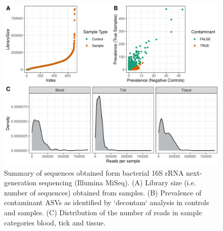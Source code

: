 \documentclass[a4paper, nobind]{templates/ociamthesis}
\begin{document}
\begin{figure}
\includegraphics[width=0.95\linewidth]{figures/ms-figs-appendix/FigA-3.1} \caption[Summary of sequences obtained from bacterial 16S rRNA metabarcoding.]{Summary of sequences obtained form bacterial 16S rRNA next-generation sequencing (Illumina MiSeq). (A) Library size (i.e. number of sequences) obtained from samples. (B) Prevalence of contaminant ASVs as identified by `decontam` analysis in controls and samples. (C) Distribution of the number of reads in sample categories blood, tick and tissue.}\label{fig:FA31}
\end{figure}

\newpage
\end{document}
